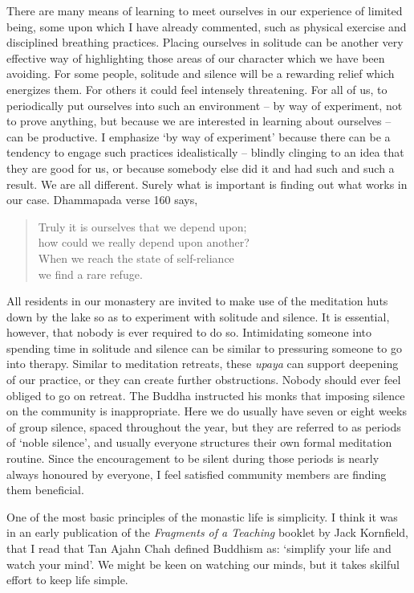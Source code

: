 There are many means of learning to meet ourselves in our experience of
limited being, some upon which I have already commented, such as
physical exercise and disciplined breathing practices. Placing ourselves
in solitude can be another very effective way of highlighting those
areas of our character which we have been avoiding. For some people,
solitude and silence will be a rewarding relief which energizes them.
For others it could feel intensely threatening. For all of us, to
periodically put ourselves into such an environment -- by way of
experiment, not to prove anything, but because we are interested in
learning about ourselves -- can be productive. I emphasize `by way of
experiment' because there can be a tendency to engage such practices
idealistically -- blindly clinging to an idea that they are good for us,
or because somebody else did it and had such and such a result. We are
all different. Surely what is important is finding out what works in our
case. Dhammapada verse 160 says,

\begin{quote}
  Truly it is ourselves that we depend upon;\\
  how could we really depend upon another?\\
  When we reach the state of self-reliance\\
  we find a rare refuge.
\end{quote}

All residents in our monastery are invited to make use of the meditation
huts down by the lake so as to experiment with solitude and silence. It
is essential, however, that nobody is ever required to do so.
Intimidating someone into spending time in solitude and silence can be
similar to pressuring someone to go into therapy. Similar to meditation
retreats, these \emph{upaya} can support deepening of our practice, or
they can create further obstructions. Nobody should ever feel obliged to
go on retreat. The Buddha instructed his monks that imposing silence on
the community is inappropriate. Here we do usually have seven or eight
weeks of group silence, spaced throughout the year, but they are
referred to as periods of `noble silence', and usually everyone
structures their own formal meditation routine. Since the encouragement
to be silent during those periods is nearly always honoured by everyone,
I feel satisfied community members are finding them beneficial.

One of the most basic principles of the monastic life is simplicity. I
think it was in an early publication of the \emph{Fragments of a Teaching}\cite{collected}
booklet by Jack Kornfield, that I read that
Tan Ajahn Chah defined Buddhism as: `simplify your life and watch your
mind'. We might be keen on watching our minds, but it takes skilful
effort to keep life simple.

